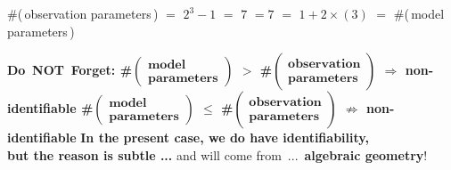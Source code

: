 \begin{frame}{}

\begin{center}
\vskip 0.90cm
\scriptsize
\#(\,observation parameters\,) $=$ $2^{3}-1$ $=$
\;\;\textbf{\normalsize\color{red}$7$}
\textbf{\normalsize\color{red}\;$=$\;$7$}\;\;
$=$ $1+2 \times(3)$ $=$ \#(\,model parameters\,)

\vskip 0.2cm

\pause
\normalsize
\vskip -4.75cm
\textbf{\color{titlefontblue}\Huge Do \pause \,NOT \pause \,Forget:\vskip 0.1cm
\pause\large
{\LARGE\#\scriptsize$\left(\!\begin{array}{c}\textbf{model} \\ \textbf{parameters}\end{array}\!\right)$}
$>$
{\LARGE\#\scriptsize$\left(\!\begin{array}{c}\textbf{observation} \\ \textbf{parameters}\end{array}\!\right)$}
\;$\Rightarrow$\; {\small non-identifiable}
\vskip 0.2cm
\pause\large
{\LARGE\#\scriptsize$\left(\!\begin{array}{c}\textbf{model} \\ \textbf{parameters}\end{array}\!\right)$}
$\leq$
{\LARGE\#\scriptsize$\left(\!\begin{array}{c}\textbf{observation} \\ \textbf{parameters}\end{array}\!\right)$}
\;$\not\Rightarrow$\;
{\small{\color{white}non-}identifiable}}
\pause
\vskip 0.8cm
\textbf{\normalsize\color{titlefontblue}In the present case, we do have identifiability,\\ but the reason is subtle ...}
\pause
\vskip 0.5cm
{\color{titlefontblue}and will come from \,...\, \pause \textbf{algebraic geometry}!}
\end{center}

\end{frame}
\normalsize

